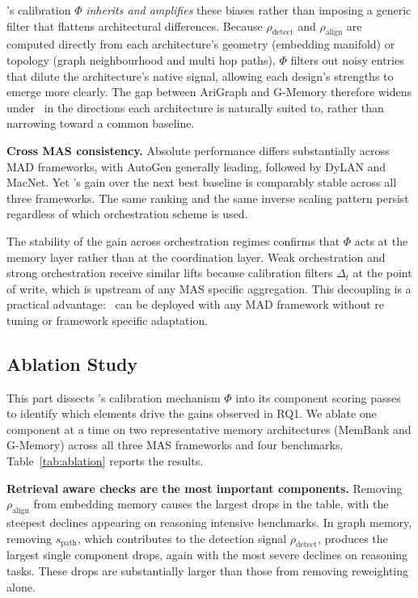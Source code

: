 \system's calibration $\Phi$ \emph{inherits and amplifies} these biases rather than imposing a generic filter that flattens architectural differences. Because $\rho_{\text{detect}}$ and $\rho_{\text{align}}$ are computed directly from each architecture's geometry (embedding manifold) or topology (graph neighbourhood and multi hop paths), $\Phi$ filters out noisy entries that dilute the architecture's native signal, allowing each design's strengths to emerge more clearly. The gap between AriGraph and G-Memory therefore widens under \system\ in the directions each architecture is naturally suited to, rather than narrowing toward a common baseline.

\textbf{Cross MAS consistency.} 
Absolute performance differs substantially across MAD frameworks, with AutoGen generally leading, followed by DyLAN and MacNet. Yet \system's gain over the next best baseline is comparably stable across all three frameworks. The same ranking and the same inverse scaling pattern persist regardless of which orchestration scheme is used.

The stability of the gain across orchestration regimes confirms that $\Phi$ acts at the memory layer rather than at the coordination layer. Weak orchestration and strong orchestration receive similar lifts because calibration filters $\Delta_t$ at the point of write, which is upstream of any MAS specific aggregation. This decoupling is a practical advantage: \system\ can be deployed with any MAD framework without re tuning or framework specific adaptation.





\subsection{Ablation Study}
\label{app:ablation}


This part dissects \system's calibration mechanism $\Phi$ into its component scoring passes to identify which elements drive the gains observed in RQ1. We ablate one component at a time on two representative memory architectures (MemBank and G-Memory) across all three MAS frameworks and four benchmarks. Table~\ref{tab:ablation} reports the results.

\textbf{Retrieval aware checks are the most important components.}
Removing $\rho_{\text{align}}$ from embedding memory causes the largest drops in the table, with the steepest declines appearing on reasoning intensive benchmarks. In graph memory, removing $s_{\text{path}}$, which contributes to the detection signal $\rho_{\text{detect}}$, produces the largest single component drops, again with the most severe declines on reasoning tasks. These drops are substantially larger than those from removing reweighting alone.

